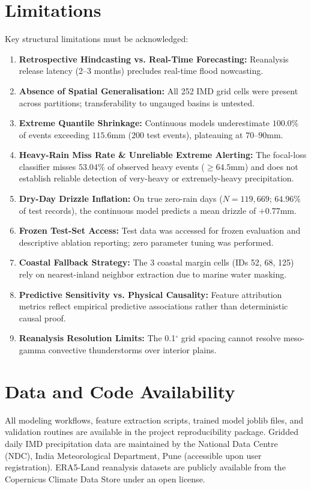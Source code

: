 \documentclass[pdflatex,sn-mathphys,Numbered]{sn-jnl}
\begin{document}
\section{Limitations}\label{sec6}
Key structural limitations must be acknowledged:
\begin{enumerate}
    \item \textbf{Retrospective Hindcasting vs. Real-Time Forecasting:} Reanalysis release latency (2--3 months) precludes real-time flood nowcasting.
    \item \textbf{Absence of Spatial Generalisation:} All 252 IMD grid cells were present across partitions; transferability to ungauged basins is untested.
    \item \textbf{Extreme Quantile Shrinkage:} Continuous models underestimate $100.0\%$ of events exceeding $115.6$\;mm ($200$ test events), plateauing at $70$--$90$\;mm.
    \item \textbf{Heavy-Rain Miss Rate \& Unreliable Extreme Alerting:} The focal-loss classifier misses $53.04\%$ of observed heavy events ($\ge 64.5$\;mm) and does not establish reliable detection of very-heavy or extremely-heavy precipitation.
    \item \textbf{Dry-Day Drizzle Inflation:} On true zero-rain days ($N = 119,669$; $64.96\%$ of test records), the continuous model predicts a mean drizzle of $+0.77$\;mm.
    \item \textbf{Frozen Test-Set Access:} Test data was accessed for frozen evaluation and descriptive ablation reporting; zero parameter tuning was performed.
    \item \textbf{Coastal Fallback Strategy:} The 3 coastal margin cells (IDs 52, 68, 125) rely on nearest-inland neighbor extraction due to marine water masking.
    \item \textbf{Predictive Sensitivity vs. Physical Causality:} Feature attribution metrics reflect empirical predictive associations rather than deterministic causal proof.
    \item \textbf{Reanalysis Resolution Limits:} The 0.1$^\circ$ grid spacing cannot resolve meso-gamma convective thunderstorms over interior plains.
\end{enumerate}

\section{Data and Code Availability}\label{sec7}
All modeling workflows, feature extraction scripts, trained model joblib files, and validation routines are available in the project reproducibility package. Gridded daily IMD precipitation data are maintained by the National Data Centre (NDC), India Meteorological Department, Pune (accessible upon user registration). ERA5-Land reanalysis datasets are publicly available from the Copernicus Climate Data Store under an open license.
\end{document}
